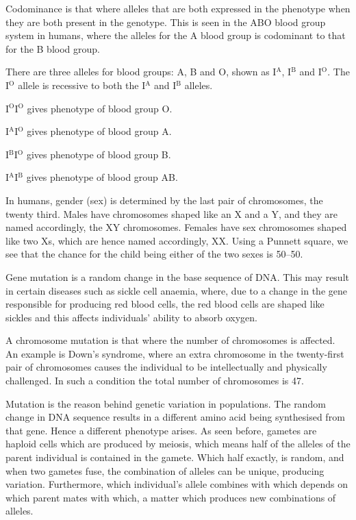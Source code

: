 Codominance is that where alleles that are both expressed in the phenotype when they are both
present in the genotype. This is seen in the ABO blood group system in humans, where the alleles
for the A blood group is codominant to that for the B blood group.

There are three alleles for blood groups: A, B and O, shown as I$^{\textrm{A}}$, I$^{\textrm{B}}$
and I$^{\textrm{O}}$. The I$^{\textrm{O}}$ allele is recessive to both the I$^{\textrm{A}}$ and
I$^{\textrm{B}}$ alleles.

\begin{center}
	I$^\textrm{O}$I$^\textrm{O}$ gives phenotype of blood group O.

	I$^\textrm{A}$I$^\textrm{O}$ gives phenotype of blood group A.

	I$^\textrm{B}$I$^\textrm{O}$ gives phenotype of blood group B.

	I$^\textrm{A}$I$^\textrm{B}$ gives phenotype of blood group AB.
\end{center}

In humans, gender (sex) is determined by the last pair of chromosomes, the twenty third. Males have
chromosomes shaped like an X and a Y, and they are named accordingly, the XY chromosomes. Females
have sex chromosomes shaped like two Xs, which are hence named accordingly, XX. Using a Punnett
square, we see that the chance for the child being either of the two sexes is 50--50.

Gene mutation is a random change in the base sequence of DNA. This may result in certain diseases
such as sickle cell anaemia, where, due to a change in the gene responsible for producing red blood
cells, the red blood cells are shaped like sickles and this affects individuals' ability to absorb
oxygen.

A chromosome mutation is that where the number of chromosomes is affected. An example is Down's
syndrome, where an extra chromosome in the twenty-first pair of chromosomes causes the individual
to be intellectually and physically challenged. In such a condition the total number of chromosomes
is 47.

Mutation is the reason behind genetic variation in populations. The random change in DNA sequence
results in a different amino acid being synthesised from that gene. Hence a different phenotype
arises. As seen before, gametes are haploid cells which are produced by meiosis, which means half
of the alleles of the parent individual is contained in the gamete. Which half exactly, is
random, and when two gametes fuse, the combination of alleles can be unique, producing variation.
Furthermore, which individual's allele combines with which depends on which parent mates with which,
a matter which produces new combinations of alleles.

